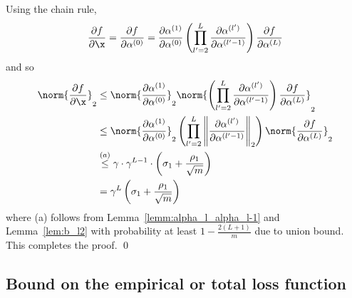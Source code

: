 \lemflips*
\proof
Using the chain rule,
\begin{equation*}
\frac{\partial f}{\partial \x} =  \frac{\partial f}{\partial \alpha^{(0)}}= \frac{\partial \alpha^{(1)}}{\partial \alpha^{(0)}}\left(\prod^{L}_{l'=2}\frac{\partial \alpha^{(l')}}{\partial \alpha^{(l'-1)}}\right) \frac{\partial f}{\partial \alpha^{(L)}}
\end{equation*}
and so
\begin{align*}
\norm{\frac{\partial f}{\partial \x}}_2
& \leq \norm{\frac{\partial \alpha^{(1)}}{\partial \alpha^{(0)}}}_2
    \norm{\left(\prod^{L}_{l'=2}\frac{\partial \alpha^{(l')}}{\partial \alpha^{(l'-1)}}\right) \frac{\partial f}{\partial \alpha^{(L)}}}_2 \\ 
& \leq \norm{\frac{\partial \alpha^{(1)}}{\partial \alpha^{(0)}}}_2
    \left( \prod^{L}_{l'=2} \left\| \frac{\partial \alpha^{(l')}}{\partial \alpha^{(l'-1)}} \right\|_2 \right)  \norm{\frac{\partial f}{\partial \alpha^{(L)}}}_2 \\    
& \overset{(a)}{\leq} \gamma \cdot \gamma^{L-1} \cdot \left(\sigma_1+\frac{\rho_1}{\sqrt{m}}\right) \\
& = \gamma^{L}\left(\sigma_1+\frac{\rho_1}{\sqrt{m}}\right) 
\end{align*}
where (a) follows from Lemma~\ref{lemm:alpha_l_alpha_l-1} and Lemma~\ref{lem:b_l2} with probability at least $1-\frac{2(L+1)}{m}$ due to union bound. This completes the proof. \qed  

\subsection{Bound on the empirical or total loss function}

\lemLbounds*

